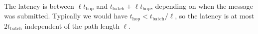 \documentclass{llncs}
\begin{document}
The latency is between $\ell t_\mathrm{hop}$ and $t_\mathrm{batch} +
\ell t_\mathrm{hop}$, depending on when the message was submitted.
Typically we would have $t_\mathrm{hop} < t_\mathrm{batch}/\ell$, so the
latency is at most $2t_\mathrm{batch}$ independent of the path length
$\ell$.










\end{document}
